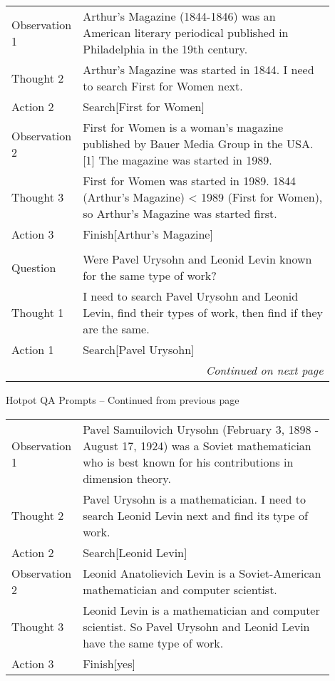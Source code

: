 \begin{table}[H]
\begin{minipage}{0.9\linewidth}
\begin{tabular}{l p{0.9\linewidth}}
Observation 1 &  Arthur's Magazine (1844-1846) was an American literary periodical published in Philadelphia in the 19th century. \\
Thought 2 &  Arthur's Magazine was started in 1844. I need to search First for Women next.\\
Action 2 &  Search[First for Women]\\
Observation 2 &  First for Women is a woman's magazine published by Bauer Media Group in the USA.[1] The magazine was started in 1989. \\
Thought 3 &  First for Women was started in 1989. 1844 (Arthur's Magazine) < 1989 (First for Women), so Arthur's Magazine was started first.\\
Action 3 &  Finish[Arthur's Magazine]\\
\\
Question &  Were Pavel Urysohn and Leonid Levin known for the same type of work?\\
Thought 1 &  I need to search Pavel Urysohn and Leonid Levin, find their types of work, then find if they are the same.\\
Action 1 &  Search[Pavel Urysohn]\\

\midrule \multicolumn{2}{r}{\textit{Continued on next page}} \\



\end{tabular}
\end{minipage}%
\end{table}


\begin{table}[H]
\scriptsize
\begin{minipage}{0.9\linewidth}
Hotpot QA Prompts -- Continued from previous page
\centering
\ttfamily
\begin{tabular}{l p{0.9\linewidth}}
\midrule
Observation 1 &  Pavel Samuilovich Urysohn (February 3, 1898 - August 17, 1924) was a Soviet mathematician who is best known for his contributions in dimension theory.\\
Thought 2 &  Pavel Urysohn is a mathematician. I need to search Leonid Levin next and find its type of work.\\
Action 2 &  Search[Leonid Levin]\\
Observation 2 &  Leonid Anatolievich Levin is a Soviet-American mathematician and computer scientist. \\
Thought 3 &  Leonid Levin is a mathematician and computer scientist. So Pavel Urysohn and Leonid Levin have the same type of work. \\
Action 3 &  Finish[yes]\\
\bottomrule
\end{tabular}
\end{minipage}%
\end{table}

